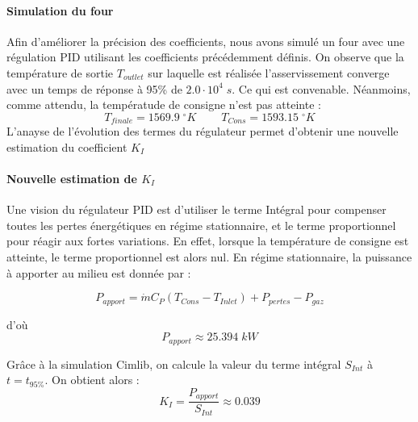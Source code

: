 \documentclass[12pt, a4paper, french, BCOR = 0pt, DIV = 10]{scrartcl}
\begin{document}
     \paragraph{Simulation du four}
     Afin d'améliorer la précision des coefficients, nous avons simulé un four avec une régulation PID utilisant les coefficients précédemment définis. On observe que la température de sortie $T_{outlet}$ sur laquelle est réalisée l'asservissement converge avec un temps de réponse à 95\% de $2.0\cdot10^4 \; s$. Ce qui est convenable. Néanmoins, comme attendu, la températude de consigne n'est pas atteinte :
     $$T_{finale}=1569.9 \;^{\circ}K ~~~~~~~~~~ T_{Cons}=1593.15 \;^{\circ}K$$
     L'anayse de l'évolution des termes du régulateur permet d'obtenir une nouvelle estimation du coefficient $K_I$

     \paragraph{Nouvelle estimation de $K_I$}
     Une vision du régulateur PID est d'utiliser le terme Intégral pour compenser toutes les pertes énergétiques en régime stationnaire, et le terme proportionnel pour réagir aux fortes variations. En effet, lorsque la température de consigne est atteinte, le terme proportionnel est alors nul. En régime stationnaire, la puissance à apporter au milieu est donnée par : 
    
     $$P_{apport}=\dot{m}C_P(T_{Cons}-T_{Inlet}) + P_{pertes} - P_{gaz}$$
     
     d'où
     $$P_{apport} \approx 25.394\;kW$$

     Grâce à la simulation Cimlib, on calcule la valeur du terme intégral $S_{Int}$ à $t=t_{95\%}$. On obtient alors :
     $$K_I = \frac{P_{apport}}{S_{Int}} \approx 0.039$$
     
	
\end{document}
